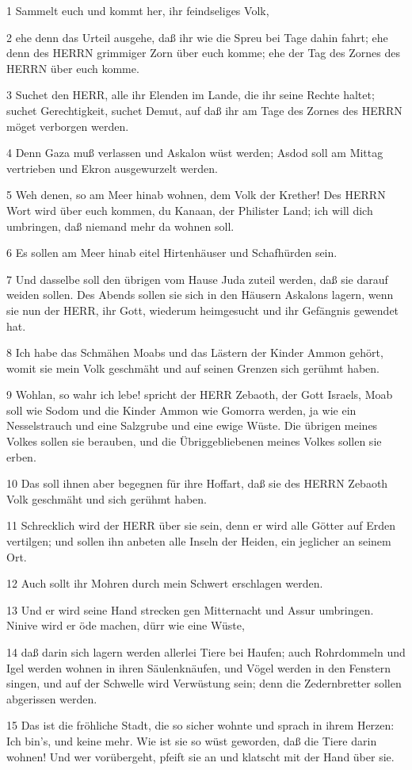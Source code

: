 \par 1 Sammelt euch und kommt her, ihr feindseliges Volk,
\par 2 ehe denn das Urteil ausgehe, daß ihr wie die Spreu bei Tage dahin fahrt; ehe denn des HERRN grimmiger Zorn über euch komme; ehe der Tag des Zornes des HERRN über euch komme.
\par 3 Suchet den HERR, alle ihr Elenden im Lande, die ihr seine Rechte haltet; suchet Gerechtigkeit, suchet Demut, auf daß ihr am Tage des Zornes des HERRN möget verborgen werden.
\par 4 Denn Gaza muß verlassen und Askalon wüst werden; Asdod soll am Mittag vertrieben und Ekron ausgewurzelt werden.
\par 5 Weh denen, so am Meer hinab wohnen, dem Volk der Krether! Des HERRN Wort wird über euch kommen, du Kanaan, der Philister Land; ich will dich umbringen, daß niemand mehr da wohnen soll.
\par 6 Es sollen am Meer hinab eitel Hirtenhäuser und Schafhürden sein.
\par 7 Und dasselbe soll den übrigen vom Hause Juda zuteil werden, daß sie darauf weiden sollen. Des Abends sollen sie sich in den Häusern Askalons lagern, wenn sie nun der HERR, ihr Gott, wiederum heimgesucht und ihr Gefängnis gewendet hat.
\par 8 Ich habe das Schmähen Moabs und das Lästern der Kinder Ammon gehört, womit sie mein Volk geschmäht und auf seinen Grenzen sich gerühmt haben.
\par 9 Wohlan, so wahr ich lebe! spricht der HERR Zebaoth, der Gott Israels, Moab soll wie Sodom und die Kinder Ammon wie Gomorra werden, ja wie ein Nesselstrauch und eine Salzgrube und eine ewige Wüste. Die übrigen meines Volkes sollen sie berauben, und die Übriggebliebenen meines Volkes sollen sie erben.
\par 10 Das soll ihnen aber begegnen für ihre Hoffart, daß sie des HERRN Zebaoth Volk geschmäht und sich gerühmt haben.
\par 11 Schrecklich wird der HERR über sie sein, denn er wird alle Götter auf Erden vertilgen; und sollen ihn anbeten alle Inseln der Heiden, ein jeglicher an seinem Ort.
\par 12 Auch sollt ihr Mohren durch mein Schwert erschlagen werden.
\par 13 Und er wird seine Hand strecken gen Mitternacht und Assur umbringen. Ninive wird er öde machen, dürr wie eine Wüste,
\par 14 daß darin sich lagern werden allerlei Tiere bei Haufen; auch Rohrdommeln und Igel werden wohnen in ihren Säulenknäufen, und Vögel werden in den Fenstern singen, und auf der Schwelle wird Verwüstung sein; denn die Zedernbretter sollen abgerissen werden.
\par 15 Das ist die fröhliche Stadt, die so sicher wohnte und sprach in ihrem Herzen: Ich bin's, und keine mehr. Wie ist sie so wüst geworden, daß die Tiere darin wohnen! Und wer vorübergeht, pfeift sie an und klatscht mit der Hand über sie.


